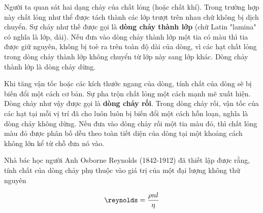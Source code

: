 Người ta quan sát hai dạng chảy của chất lỏng (hoặc chất khí). Trong trường hợp này chất lỏng như thể được tách thành các lớp trượt trên nhau chứ không bị dịch chuyển. Sự chảy như thế được gọi là \textbf{dòng chảy thành lớp} (chữ Latin "lamina" có nghĩa là lớp, dải). Nếu đưa vào dòng chảy thành lớp một tia có màu thì tia được giữ nguyên, không bị toè ra trên toàn độ dài của dòng, vì các hạt chất lỏng trong dòng chảy thành lớp không chuyển từ lớp này sang lớp khác. Dòng chảy thành lớp là dòng chảy dừng.


Khi tăng vận tốc hoặc các kích thước ngang của dòng, tính chất của dòng sẽ bị biến đổi một cách cơ bản. Sự pha trộn chất lỏng một cách mạnh mẽ xuất hiện. Dòng chảy như vậy được gọi là \textbf{dòng chảy rối}. Trong dòng chảy rối, vận tốc của các hạt tại mỗi vị trí đã cho luôn luôn bị biến đổi một cách hỗn loạn, nghĩa là dòng chảy không dừng. Nếu đưa vào dòng chảy rối một tia màu đỏ, thì chất lỏng màu đỏ được phân bố dều theo toàn tiết diện của dòng tại một khoảng cách không lớn kể từ chỗ đưa nó vào.


Nhà bác học người Anh Osborne Reynolds (1842-1912) đã thiết lập được rằng, tính chất của dòng chảy phụ thuộc vào giá trị của một đại lượng không thứ nguyên

\begin{equation}\label{eq:9_13}
	\reynolds = \frac{\rho n l}{\eta}
\end{equation}
\noindent


